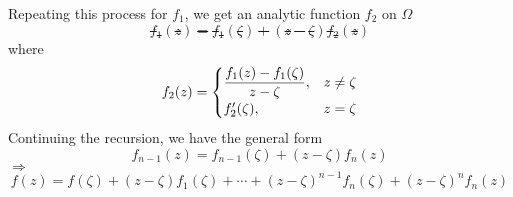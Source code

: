 Repeating this process for  $ f_1 $, we get an analytic function  $ f_2 $ on  $ \Omega $ \st 
\begin{equation}
    f_1(z)=f_1(\zeta)+(z-\zeta)f_2(z)
\end{equation} 
where 
\begin{equation}
    f_2(z)=\begin{cases}
        \displaystyle\frac{f_1(z)-f_1(\zeta)}{z-\zeta},&z\not=\zeta\\
        f_2'(\zeta),&z=\zeta
    \end{cases}
\end{equation}
Continuing the recursion, we have the general form 
\begin{equation}
    f_{n-1}(z)=f_{n-1}(\zeta)+(z-\zeta)f_n(z)
\end{equation}
 $ \Rightarrow $ \begin{equation}
    f(z)=f(\zeta)+(z-\zeta)f_1(\zeta)+\cdots+(z-\zeta)^{n-1}f_n(\zeta)+(z-\zeta)^nf_n(z)
 \end{equation}  